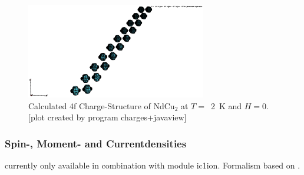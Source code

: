 \begin{figure}[hb]%
\begin{center}\leavevmode
\includegraphics[angle=0, width=0.7\textwidth]{figsrc/ndcu2b/resultss/chargesab.eps}
\end{center}
\caption{Calculated 4f Charge-Structure of NdCu$_2$ at $T=$~2~K and $H=0$.
[plot created by program {\prg charges+javaview}]}
\label{chargegraphic}
\end{figure}

\subsubsection{Spin-, Moment- and Currentdensities}

currently only available in combination with module {\prg ic1ion}.
Formalism based on \cite{balcar75-1581,balcar89-1}.

